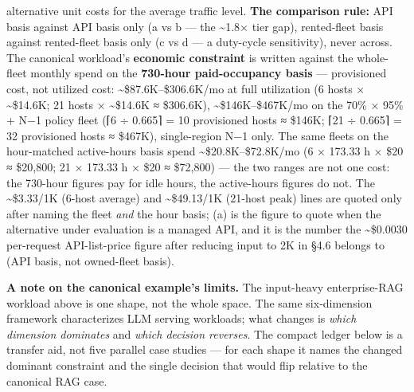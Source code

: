 alternative unit costs for the average traffic level. \textbf{The
comparison rule:} API basis against API basis only (a vs b --- the
\textasciitilde1.8× tier gap), rented-fleet basis against rented-fleet
basis only (c vs d --- a duty-cycle sensitivity), never across. The
canonical workload's \textbf{economic constraint} is written against the
whole-fleet monthly spend on the \textbf{730-hour paid-occupancy basis}
--- provisioned cost, not utilized cost:
\textasciitilde\$87.6K--\$306.6K/mo at full utilization (6 hosts ×
\textasciitilde\$14.6K; 21 hosts × \textasciitilde\$14.6K ≈ \$306.6K),
\textasciitilde\$146K--\$467K/mo on the 70\% × 95\% + N−1 policy fleet
(⌈6 ÷ 0.665⌉ = 10 provisioned hosts ≈ \$146K; ⌈21 ÷ 0.665⌉ = 32
provisioned hosts ≈ \$467K), single-region N−1 only. The same fleets on
the hour-matched active-hours basis spend
\textasciitilde\$20.8K--\$72.8K/mo (6 × 173.33 h × \$20 ≈ \$20,800; 21 ×
173.33 h × \$20 ≈ \$72,800) --- the two ranges are not one cost: the
730-hour figures pay for idle hours, the active-hours figures do not.
The \textasciitilde\$3.33/1K (6-host average) and
\textasciitilde\$49.13/1K (21-host peak) lines are quoted only after
naming the fleet \emph{and} the hour basis; (a) is the figure to quote
when the alternative under evaluation is a managed API, and it is the
number the \textasciitilde\$0.0030 per-request API-list-price figure
after reducing input to 2K in §4.6 belongs to (API basis, not
owned-fleet basis).

\textbf{A note on the canonical example's limits.} The input-heavy
enterprise-RAG workload above is one shape, not the whole space. The
same six-dimension framework characterizes LLM serving workloads; what
changes is \emph{which dimension dominates} and \emph{which decision
reverses}. The compact ledger below is a transfer aid, not five parallel
case studies --- for each shape it names the changed dominant constraint
and the single decision that would flip relative to the canonical RAG
case.


